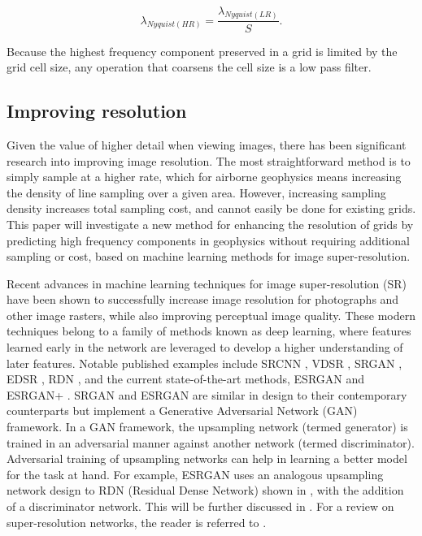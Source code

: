 \begin{equation}
    \label{eqn:hrn}
    \lambda{}_{Nyquist {(HR)}} = \frac{\lambda{}_{Nyquist {(LR)}}}{S}.
\end{equation}

Because the highest frequency component preserved in a grid is limited by the grid cell size, any operation that coarsens the cell size is a low pass filter.

\subsection{Improving resolution}
Given the value of higher detail when viewing images, there has been significant research into improving image resolution.
The most straightforward method is to simply sample at a higher rate, which for airborne geophysics means increasing the density of line sampling over a given area.
However, increasing sampling density increases total sampling cost, and cannot easily be done for existing grids.
This paper will investigate a new method for enhancing the resolution of grids by predicting high frequency components in geophysics without requiring additional sampling or cost, based on machine learning methods for image super-resolution.

Recent advances in machine learning techniques for image super-resolution (SR) have been shown to successfully increase image resolution for photographs and other image rasters, while also improving perceptual image quality.
These modern techniques belong to a family of methods known as deep learning, where features learned early in the network are leveraged to develop a higher understanding of later features.
Notable published examples include SRCNN \parencite{dongLearningDeepConvolutional2014}, VDSR \parencite{kimAccurateImageSuperresolution2016}, SRGAN \parencite{ledigPhotorealisticSingleImage2017}, EDSR \parencite{limEnhancedDeepResidual2017}, RDN \parencite{zhangResidualDenseNetwork2018}, and the current state-of-the-art methods, ESRGAN \parencite{wangESRGANEnhancedSuperresolution2018} and ESRGAN+ \parencite{rakotonirinaESRGANFurtherImproving2020}.
SRGAN and ESRGAN are similar in design to their contemporary counterparts but implement a Generative Adversarial Network (GAN) framework.
In a GAN framework, the upsampling network (termed generator) is trained in an adversarial manner against another network (termed discriminator).
Adversarial training of upsampling networks can help in learning a better model for the task at hand.
For example, ESRGAN uses an analogous upsampling network design to RDN (Residual Dense Network) shown in , with the addition of a discriminator network.
This will be further discussed in .
For a review on super-resolution networks, the reader is referred to \textcite{anwarDeepJourneySuperresolution2020}.


